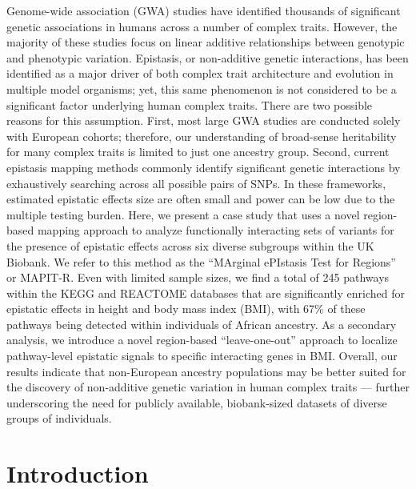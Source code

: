 \documentclass[10pt]{article}
\begin{document}
Genome-wide association (GWA) studies have identified thousands of significant genetic associations in humans across a number of complex traits. However, the majority of these studies focus on linear additive relationships between genotypic and phenotypic variation. Epistasis, or non-additive genetic interactions, has been identified as a major driver of both complex trait architecture and evolution in multiple model organisms; yet, this same phenomenon is not considered to be a significant factor underlying human complex traits. There are two possible reasons for this assumption. First, most large GWA studies are conducted solely with European cohorts; therefore, our understanding of broad-sense heritability for many complex traits is limited to just one ancestry group. Second, current epistasis mapping methods commonly identify significant genetic interactions by exhaustively searching across all possible pairs of SNPs. In these frameworks, estimated epistatic effects size are often small and power can be low due to the multiple testing burden. Here, we present a case study that uses a novel region-based mapping approach to analyze functionally interacting sets of variants for the presence of epistatic effects across six diverse subgroups within the UK Biobank. We refer to this method as the ``MArginal ePIstasis Test for Regions'' or MAPIT-R. Even with limited sample sizes, we find a total of 245 pathways within the KEGG and REACTOME databases that are significantly enriched for epistatic effects in height and body mass index (BMI), with 67\% of these pathways being detected within individuals of African ancestry. As a secondary analysis, we introduce a novel region-based ``leave-one-out'' approach to localize pathway-level epistatic signals to specific interacting genes in BMI. Overall, our results indicate that non-European ancestry populations may be better suited for the discovery of non-additive genetic variation in human complex traits --- further underscoring the need for publicly available, biobank-sized datasets of diverse groups of individuals.


\section*{Introduction}\label{MAPITR-Introduction}
\end{document}
